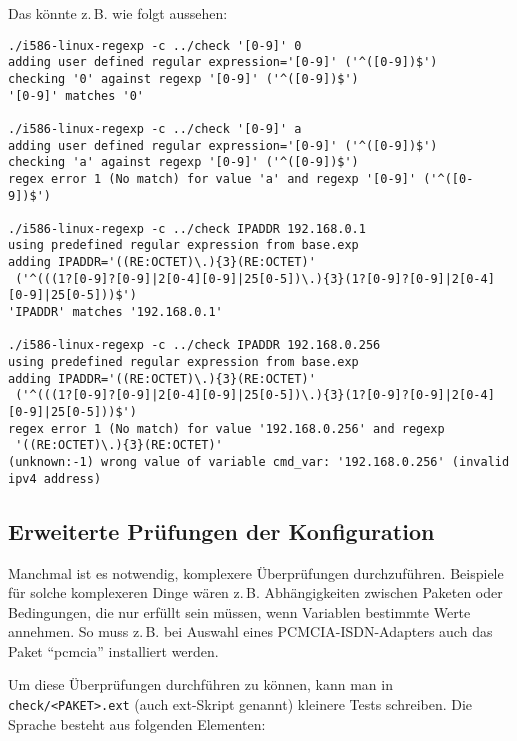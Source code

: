 Das könnte z.\,B. wie folgt aussehen:
\begin{example}
\begin{verbatim}
./i586-linux-regexp -c ../check '[0-9]' 0
adding user defined regular expression='[0-9]' ('^([0-9])$')
checking '0' against regexp '[0-9]' ('^([0-9])$')
'[0-9]' matches '0'

./i586-linux-regexp -c ../check '[0-9]' a
adding user defined regular expression='[0-9]' ('^([0-9])$')
checking 'a' against regexp '[0-9]' ('^([0-9])$')
regex error 1 (No match) for value 'a' and regexp '[0-9]' ('^([0-9])$')

./i586-linux-regexp -c ../check IPADDR 192.168.0.1
using predefined regular expression from base.exp
adding IPADDR='((RE:OCTET)\.){3}(RE:OCTET)'
 ('^(((1?[0-9]?[0-9]|2[0-4][0-9]|25[0-5])\.){3}(1?[0-9]?[0-9]|2[0-4][0-9]|25[0-5]))$')
'IPADDR' matches '192.168.0.1'

./i586-linux-regexp -c ../check IPADDR 192.168.0.256
using predefined regular expression from base.exp
adding IPADDR='((RE:OCTET)\.){3}(RE:OCTET)'
 ('^(((1?[0-9]?[0-9]|2[0-4][0-9]|25[0-5])\.){3}(1?[0-9]?[0-9]|2[0-4][0-9]|25[0-5]))$')
regex error 1 (No match) for value '192.168.0.256' and regexp
 '((RE:OCTET)\.){3}(RE:OCTET)'
(unknown:-1) wrong value of variable cmd_var: '192.168.0.256' (invalid ipv4 address)
\end{verbatim}
\end{example}


\subsection{Erweiterte Prüfungen der Konfiguration}

    Manchmal ist es notwendig, komplexere Überprüfungen durchzuführen.
    Beispiele für solche komplexeren Dinge wären z.\,B. Abhängigkeiten
    zwischen Paketen oder Bedingungen, die nur erfüllt sein müssen,
    wenn Variablen bestimmte Werte annehmen. So muss z.\,B. bei Auswahl
    eines PCMCIA-ISDN-Adapters auch das Paket "`pcmcia"' installiert
    werden.

    Um diese Überprüfungen durchführen zu können, kann man in
    \texttt{check/<PAKET>.ext} (auch ext-Skript genannt) kleinere Tests
    schreiben. Die Sprache besteht aus folgenden Elementen:

